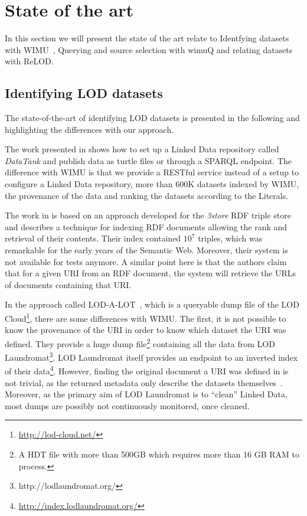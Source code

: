 \documentclass[sw]{iosart2x}
\begin{document}
\section{State of the art}
\label{sec:related}

In this section we will present the state of the art relate to Identfying datasets with WIMU~\cite{valdestilhas2018my}, Querying and source selection with wimuQ\cite{valdestilhas2019more} and relating datasets with ReLOD.

\subsection{Identifying LOD datasets}
The state-of-the-art of identifying LOD datasets is presented in the following and highlighting the differences with our approach.

The work presented in \cite{colpaert2014painless} shows how to set up a Linked Data repository called \emph{DataTank} and publish data as turtle files or through a SPARQL endpoint.
The difference with WIMU is that we provide a RESTful service instead of a setup to configure a Linked Data repository{\color{blue}, more than 600K datasets indexed by WIMU, the provenance of the data and ranking the datasets according to the Literals}.

The work in \cite{harris2004semindex} is based on an approach developed for the \emph{3store} RDF triple store and describes a technique for indexing RDF documents allowing the rank and retrieval of their contents. 
Their index contained $10^7$ triples, which was remarkable for the early years of the Semantic Web.
Moreover, their system is not available for tests anymore.
A similar point here is that the authors claim that for a given URI from an RDF document, the system will retrieve the URLs of documents containing that URI.

In the approach called LOD-A-LOT~\cite{fernandez2017lod}, which is a queryable dump file of the LOD Cloud\footnote{\url{http://lod-cloud.net/}}, there are some differences with WIMU.
The first, it is not possible to know the provenance of the URI in order to know which dataset the URI was defined. 
They provide a huge dump file\footnote{A HDT file with more than 500GB which requires more than 16 GB RAM to process.} containing all the data from LOD Laundromat\footnote{http://lodlaundromat.org/}.
LOD Laundromat itself provides an endpoint to an inverted index of their data\footnote{\url{http://index.lodlaundromat.org/}}.
However, finding the original document a URI was defined in is not trivial, as the returned metadata only describe the datasets themselves~\cite{beek2014lod}.
Moreover, as the primary aim of LOD Laundromat is to \enquote{clean} Linked Data, most dumps are possibly not continuously monitored, once cleaned.
\end{document}
